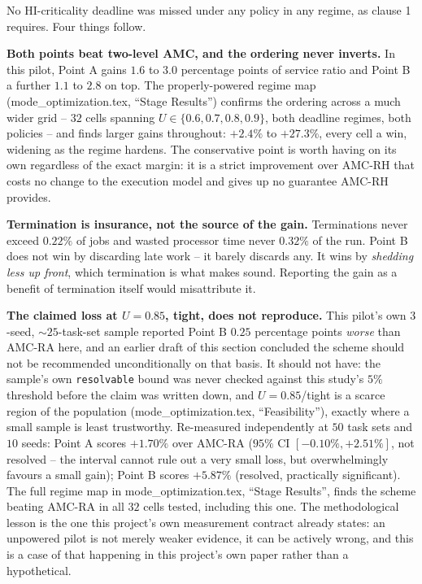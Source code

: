 \noindent No HI-criticality deadline was missed under any policy in any regime,
as clause 1 requires. Four things follow.

\textbf{Both points beat two-level AMC, and the ordering never inverts.} In
this pilot, Point A gains $1.6$ to $3.0$ percentage points of service ratio and
Point B a further $1.1$ to $2.8$ on top. The properly-powered regime map
(mode\_optimization.tex, ``Stage Results'') confirms the ordering across a much
wider grid -- $32$ cells spanning $U \in \{0.6, 0.7, 0.8, 0.9\}$, both deadline
regimes, both policies -- and finds larger gains throughout: $+2.4\%$ to
$+27.3\%$, every cell a win, widening as the regime hardens. The conservative
point is worth having on its own regardless of the exact margin: it is a strict
improvement over AMC-RH that costs no change to the execution model and gives
up no guarantee AMC-RH provides.

\textbf{Termination is insurance, not the source of the gain.} Terminations
never exceed $0.22\%$ of jobs and wasted processor time never $0.32\%$ of the
run. Point B does not win by discarding late work -- it barely discards any. It
wins by \emph{shedding less up front}, which termination is what makes sound.
Reporting the gain as a benefit of termination itself would misattribute it.

\textbf{The claimed loss at $U=0.85$, tight, does not reproduce.} This pilot's
own $3$-seed, $\sim\!25$-task-set sample reported Point B $0.25$ percentage
points \emph{worse} than AMC-RA here, and an earlier draft of this section
concluded the scheme should not be recommended unconditionally on that basis.
It should not have: the sample's own \texttt{resolvable} bound was never
checked against this study's $5\%$ threshold before the claim was written down,
and $U=0.85$/tight is a scarce region of the population
(mode\_optimization.tex, ``Feasibility''), exactly where a small sample is least
trustworthy. Re-measured independently at $50$ task sets and $10$ seeds: Point
A scores $+1.70\%$ over AMC-RA ($95\%$ CI $[-0.10\%, +2.51\%]$, not resolved --
the interval cannot rule out a very small loss, but overwhelmingly favours a
small gain); Point B scores $+5.87\%$ (resolved, practically significant). The
full regime map in mode\_optimization.tex, ``Stage Results'', finds the scheme
beating AMC-RA in all $32$ cells tested, including this one. The
methodological lesson is the one this project's own measurement contract
already states: an unpowered pilot is not merely weaker evidence, it can be
actively wrong, and this is a case of that happening in this project's own
paper rather than a hypothetical.

